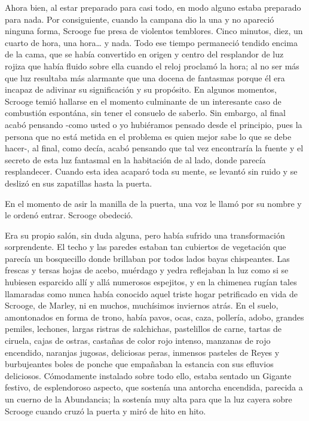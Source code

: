\documentclass{novela}
\begin{document}
 Ahora bien, al estar preparado para casi todo, en modo alguno estaba preparado para nada. Por consiguiente, cuando la campana dio la una y no apareció ninguna forma, Scrooge fue presa de violentos temblores. Cinco minutos, diez, un cuarto de hora, una hora{\ldots} y nada. Todo ese tiempo permaneció tendido encima de la cama, que se había convertido en origen y centro del resplandor de luz rojiza que había fluido sobre ella cuando el reloj proclamó la hora; al no ser más que luz resultaba más alarmante que una docena de fantasmas porque él era incapaz de adivinar su significación y su propósito. En algunos momentos, Scrooge temió hallarse en el momento culminante de un interesante caso de combustión espontána, sin tener el consuelo de saberlo. Sin embargo, al final acabó pensando -como usted o yo hubiéramos pensado desde el principio, pues la persona que no está metida en el problema es quien mejor sabe lo que se debe hacer-, al final, como decía, acabó pensando que tal vez encontraría la fuente y el secreto de esta luz fantasmal en la habitación de al lado, donde parecía resplandecer. Cuando esta idea acaparó toda su mente, se levantó sin ruido y se deslizó en sus zapatillas hasta la puerta.

 En el momento de asir la manilla de la puerta, una voz le llamó por su nombre y le ordenó entrar. Scrooge obedeció.

 Era su propio salón, sin duda alguna, pero había sufrido una transformación sorprendente. El techo y las paredes estaban tan cubiertos de vegetación que parecía un bosquecillo donde brillaban por todos lados bayas chispeantes. Las frescas y tersas hojas de acebo, muérdago y yedra reflejaban la luz como si se hubiesen esparcido allí y allá numerosos espejitos, y en la chimenea rugían tales llamaradas como nunca había conocido aquel triste hogar petrificado en vida de Scrooge, de Marley, ni en muchos, muchísimos inviernos atrás. En el suelo, amontonados en forma de trono, había pavos, ocas, caza, pollería, adobo, grandes pemiles, lechones, largas ristras de salchichas, pastelillos de carne, tartas de ciruela, cajas de ostras, castañas de color rojo intenso, manzanas de rojo encendido, naranjas jugosas, deliciosas peras, inmensos pasteles de Reyes y burbujeantes boles de ponche que empañaban la estancia con sus efluvios deliciosos. Cómodamente instalado sobre todo ello, estaba sentado un Gigante festivo, de esplendoroso aspecto, que sostenía una antorcha encendida, parecida a un cuerno de la Abundancia; la sostenía muy alta para que la luz cayera sobre Scrooge cuando cruzó la puerta y miró de hito en hito.
\end{document}
